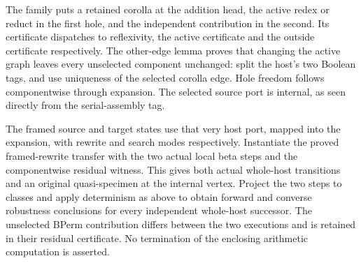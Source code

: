 
The family puts a retained corolla at the addition head, the active redex
or reduct in the first hole, and the independent contribution in the second.
Its certificate dispatches to reflexivity, the active certificate and the
outside certificate respectively. The other-edge lemma proves that changing
the active graph leaves every unselected component unchanged: split the
host's two Boolean tags, and use uniqueness of the selected corolla edge.
Hole freedom follows componentwise through expansion. The selected source
port is internal, as seen directly from the serial-assembly tag.


The framed source and target states use that very host port, mapped into
the expansion, with rewrite and search modes respectively. Instantiate the
proved framed-rewrite transfer with the two actual local beta steps and the
componentwise residual witness. This gives both actual whole-host transitions
and an original quasi-specimen at the internal vertex. Project the two steps
to classes and apply determinism as above to obtain forward and converse
robustness conclusions for every independent whole-host successor.
The unselected BPerm contribution differs between the two executions and is
retained in their residual certificate. No termination of the enclosing
arithmetic computation is asserted.


